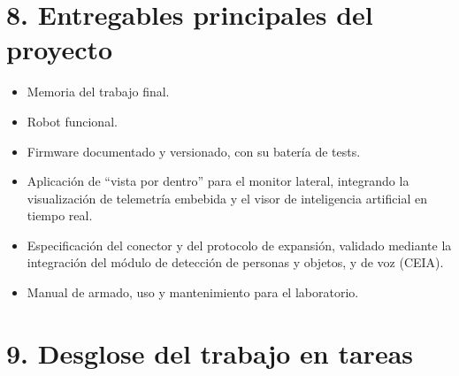 \documentclass[
11pt, %
]{charter}
\begin{document}
\section{8. Entregables principales del proyecto}
\label{sec:entregables}

\begin{itemize}
	\item Memoria del trabajo final.
	\item Robot funcional.
	\item Firmware documentado y versionado, con su batería de tests.
	\item Aplicación de ``vista por dentro'' para el monitor lateral, integrando la visualización de telemetría embebida y el visor de inteligencia artificial en tiempo real.
	\item Especificación del conector y del protocolo de expansión, validado mediante la integración del módulo de detección de personas y objetos, y de voz (CEIA).
	\item Manual de armado, uso y mantenimiento para el laboratorio.
\end{itemize}

\section{9. Desglose del trabajo en tareas}
\label{sec:wbs}
\end{document}

